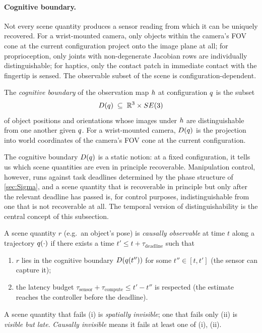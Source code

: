 \paragraph{Cognitive boundary.}
Not every scene quantity produces a sensor reading from which it
can be uniquely recovered. For a wrist-mounted camera, only
objects within the camera's FOV cone at the current configuration
project onto the image plane at all; for proprioception, only
joints with non-degenerate Jacobian rows are individually
distinguishable; for haptics, only the contact patch in immediate
contact with the fingertip is sensed. The observable subset of
the scene is configuration-dependent.

\begin{definition}\label{def:cognitive-boundary}
The \emph{cognitive boundary} of the observation map $h$
at configuration $q$ is the subset
\[
  D(q)
  \;\subseteq\; \mathbb{R}^{3} \times SE(3)
\]
of object positions and orientations whose images under
$h$ are distinguishable from one another given $q$.
For a wrist-mounted camera, $D(q)$ is the projection
into world coordinates of the camera's FOV cone at the current
configuration.
\end{definition}

The cognitive boundary $D(q)$ is a static notion: at a
fixed configuration, it tells us which scene quantities are even
in principle recoverable. Manipulation control, however, runs
against task deadlines determined by the phase structure of
\cref{sec:Sigma}, and a scene quantity that is recoverable in
principle but only after the relevant deadline has passed is, for
control purposes, indistinguishable from one that is not
recoverable at all. The temporal version of distinguishability is
the central concept of this subsection.

\begin{definition}\label{def:causal-obs}
A scene quantity $r$ (e.g.\ an object's pose) is \emph{causally
observable} at time $t$ along a trajectory $q(\cdot)$ if
there exists a time $t' \le t + \tau_{\mathrm{deadline}}$ such
that
\begin{enumerate}[label=(\roman*),nosep]
  \item $r$ lies in the cognitive boundary $D(q(t''))$ for
        some $t'' \in [t, t']$ (the sensor can capture it);
  \item the latency budget
        $\tau_{\mathrm{sensor}} + \tau_{\mathrm{compute}}
        \le t' - t''$
        is respected (the estimate reaches the controller before
        the deadline).
\end{enumerate}
A scene quantity that fails (i) is \emph{spatially invisible}; one
that fails only (ii) is \emph{visible but late}. \emph{Causally
invisible} means it fails at least one of (i), (ii).
\end{definition}

